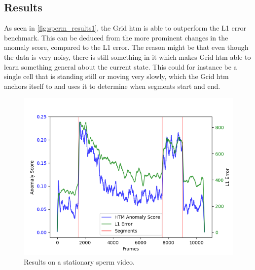 \subsection{Results}
As seen in \autoref{fig:sperm_results1}, the Grid \gls*{htm} is able to outperform the L1 error benchmark. This can be deduced from the more prominent changes in the anomaly score, compared to the L1 error. The reason might be that even though the data is very noisy, there is still something in it which makes Grid \gls*{htm} able to learn something general about the current state. This could for instance be a single cell that is standing still or moving very slowly, which the Grid \gls*{htm} anchors itself to and uses it to determine when segments start and end.
\begin{figure}[H]
    \centering
    \includegraphics[width=\textwidth]{resources/experiments/sperm/sperm_result1.png}
    \caption[Stationary Video Results]{Results on a stationary sperm video.}
    \label{fig:sperm_results1}
\end{figure}


